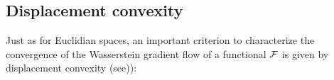 



\subsection{Displacement convexity}\label{subsec:lambda_convexity}
Just as for Euclidian spaces, an  important criterion to characterize the convergence of the Wasserstein gradient flow of a functional ${{\mathcal F}}$ is given by displacement convexity (see\cite[Definition 16.5]{Villani:2004})):

